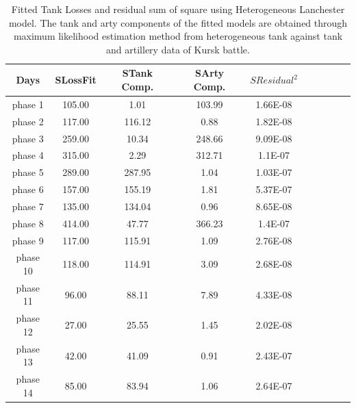 \documentclass[]{article}
\begin{document}
\begin{table}
\centering
\tiny
\caption{Fitted Tank Losses and residual sum of square using Heterogeneous Lanchester model. The tank and arty components of the fitted models are obtained through maximum likelihood estimation method from heterogeneous tank against tank and artillery data of Kursk battle.}
{\begin{tabular}{|c|c|c|c|c|c|c|c|c|c|}   \hline\hline
Days & SLossFit	& STank Comp. &	SArty Comp.	& $SResidual^2$	 \\
\hline
\hline
phase 1&	105.00&	1.01&	103.99&	1.66E-08	\\\hline
phase 2	&117.00	&116.12&	0.88&	1.82E-08	\\\hline
phase 3	&259.00	&10.34&	248.66	&9.09E-08\\\hline
phase 4	&315.00	&2.29&312.71&	1.1E-07\\\hline
phase 5	&289.00	&287.95	&1.04	&1.03E-07\\\hline
phase 6	&157.00	&155.19	&1.81&	5.37E-07\\\hline
phase 7	&135.00	&134.04&	0.96	&8.65E-08	\\\hline
phase 8	&414.00	&47.77&	366.23	&1.4E-07\\\hline
phase 9	&117.00	&115.91&	1.09&	2.76E-08\\\hline
phase 10&	118.00&	114.91&	3.09&	2.68E-08\\\hline
phase 11&	96.00&	88.11	&7.89&	4.33E-08\\\hline
phase 12&	27.00&	25.55&	1.45&	2.02E-08\\\hline
phase 13&	42.00	&41.09	& 0.91&	2.43E-07\\\hline
phase 14&	85.00&	83.94&	1.06	&2.64E-07\\\hline

\hline

\end{tabular}}
\end{table}
\end{document}
